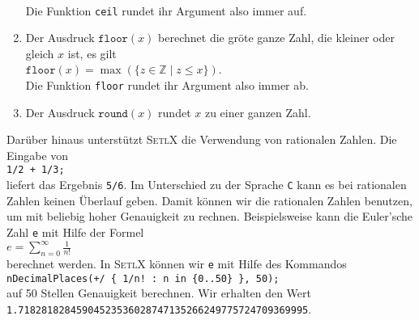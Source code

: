 \begin{enumerate}
      \\[0.2cm]
      Die Funktion \texttt{ceil} rundet ihr Argument also immer auf.
\item Der Ausdruck $\texttt{floor}(x)$ berechnet die gr\"{o}\3te ganze Zahl, die kleiner oder
      gleich $x$ ist, es gilt
      \\[0.2cm]
      \hspace*{1.3cm}
      $\texttt{floor}(x) = \max(\{ z \in \mathbb{Z} \mid z \leq x \})$.
      \\[0.2cm]
      Die Funktion \texttt{floor} rundet ihr Argument also immer ab.
\item Der Ausdruck $\texttt{round}(x)$ rundet $x$ zu einer ganzen Zahl.
\end{enumerate}
Dar\"{u}ber hinaus unterst\"{u}tzt \textsc{SetlX} die Verwendung von rationalen Zahlen.  Die
Eingabe von
\\[0.2cm]
\hspace*{1.3cm}
\texttt{1/2 + 1/3;}
\\[0.2cm]
liefert das Ergebnis \texttt{5/6}.  Im Unterschied zu der Sprache \texttt{C} kann es bei rationalen
Zahlen keinen \"{U}berlauf geben.  Damit k\"{o}nnen wir die rationalen Zahlen benutzen, um mit beliebig
hoher Genauigkeit zu rechnen.  Beispielsweise kann die Euler'sche Zahl \texttt{e} mit Hilfe der Formel
\\[0.2cm]
\hspace*{1.3cm}
$\displaystyle e = \sum\limits_{n=0}^\infty \frac{1}{n!}$
\\[0.2cm]
berechnet werden.  In \textsc{SetlX} k\"{o}nnen wir \texttt{e} mit Hilfe des Kommandos
\\[0.2cm]
\hspace*{1.3cm}
\texttt{nDecimalPlaces(+/ \{ 1/n! : n in \{0..50\} \}, 50);}
\\[0.2cm]
auf 50 Stellen Genauigkeit berechnen.  Wir erhalten den Wert
\\[0.2cm]
\hspace*{1.3cm}
\texttt{1.71828182845904523536028747135266249775724709369995}.


